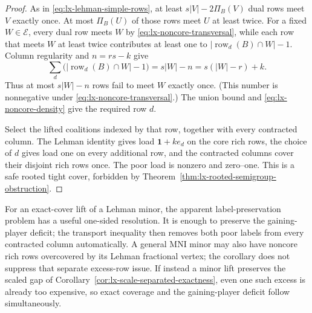 \begin{proof}
As in \eqref{eq:lx-lehman-simple-rows}, at least
$s|V|-2\Pi_B(V)$ dual rows meet $V$ exactly once.  At most $\Pi_B(U)$ of
those rows meet $U$ at least twice.  For a fixed $W\in\mathcal E$, every
dual row meets $W$ by \eqref{eq:lx-noncore-transversal}, while each row that
meets $W$ at least twice contributes at least one to
$|\operatorname{row}_d(B)\cap W|-1$.  Column regularity and $n=rs-k$ give
\[
 \sum_d\bigl(|\operatorname{row}_d(B)\cap W|-1\bigr)
 =s|W|-n=s(|W|-r)+k.
\]
Thus at most $s|W|-n$ rows fail to meet $W$ exactly once.  (This number is
nonnegative under \eqref{eq:lx-noncore-transversal}.)  The union bound and
\eqref{eq:lx-noncore-density} give the required row $d$.

Select the lifted coalitions indexed by that row, together with every
contracted column.  The Lehman identity gives load
$\mathbf1+k e_d$ on the core rich rows, the choice of $d$ gives load one on
every additional row, and the contracted columns cover their disjoint rich
rows once.  The poor load is nonzero and zero--one.  This is a safe rooted
tight cover, forbidden by
Theorem~\ref{thm:lx-rooted-semigroup-obstruction}.
\end{proof}

For an exact-cover lift of a Lehman minor, the apparent label-preservation
problem has a useful one-sided resolution.  It is enough to preserve the
gaining-player deficit; the transport inequality then removes both poor
labels from every contracted column automatically.  A general MNI minor may
also have noncore rich rows overcovered by its Lehman fractional vertex; the
corollary does not suppress that separate excess-row issue.  If instead a
minor lift preserves the scaled gap of
Corollary~\ref{cor:lx-scale-separated-exactness}, even one such excess is
already too expensive, so exact coverage and the gaining-player deficit
follow simultaneously.

